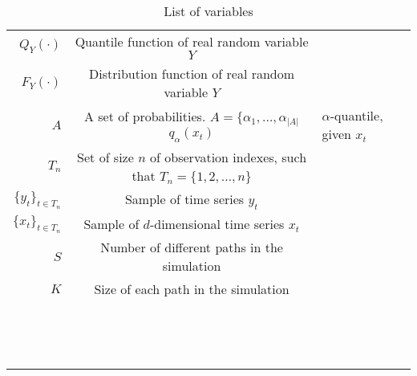 \begin{table}[htbp]\caption*{List of variables}
\begin{center}%
\begin{tabular}{r c p{10cm} }
\toprule
$Q_Y(\cdot)$ & Quantile function of real random variable $Y$ \\
$F_Y(\cdot)$ & Distribution function of real random variable $Y$ \\
$A$ & A set of probabilities. $A = \{\alpha_1, \dots, \alpha_{|A|}$
$q_\alpha(x_t)$ & $\alpha$-quantile, given $x_t$ \\
$T_n$ & Set of size $n$ of observation indexes, such that $T_n = \{1, 2, \dots, n\}$ \\
$\{y_t\}_{t \in T_n}$ & Sample of time series $y_t$  \\
$\{x_t\}_{t \in T_n}$ & Sample of $d$-dimensional time series $x_t$  \\
$S$ & Number of different paths in the simulation \\
$K$ & Size of each path in the simulation \\

 & \\
 & \\
 & \\
 & \\
 & \\
 & \\
 & \\
 & \\
 & \\
 & \\
 & \\
 & \\
 & \\
 & \\



\bottomrule
\end{tabular}
\end{center}
\label{tab:TableOfNotationForMyResearch}
\end{table}
